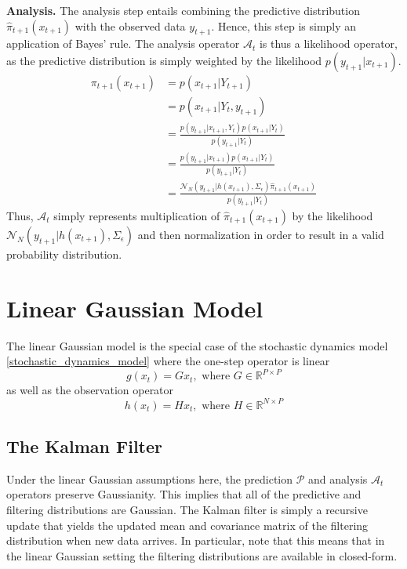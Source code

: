 \documentclass[12pt]{article}
\newcommand{\R}{\mathbb{R}}
\begin{document}
\bigskip
\noindent
\textbf{Analysis.} The analysis step entails combining the predictive distribution $\hat{\pi}_{t+1}(x_{t+1})$ with the observed data $y_{t+1}$. Hence, this step 
is simply an application of Bayes' rule. The analysis operator $\mathcal{A}_t$ is thus a likelihood operator, as the predictive distribution is simply weighted by 
the likelihood $p(y_{t+1}|x_{t+1})$. 
\begin{align*}
\pi_{t+1}(x_{t+1}) &= p(x_{t+1}|Y_{t+1}) \\
			   &= p(x_{t+1}|Y_t, y_{t+1}) \\
			   &= \frac{p(y_{t+1}|x_{t+1}, Y_t)p(x_{t+1}|Y_t)}{p(y_{t+1}|Y_t)} \\
			   &= \frac{p(y_{t+1}|x_{t+1})p(x_{t+1}|Y_t)}{p(y_{t+1}|Y_t)} \\
			   &= \frac{\mathcal{N}_N(y_{t+1}|h(x_{t+1}), \Sigma_{\epsilon}) \hat{\pi}_{t+1}(x_{t+1})}{p(y_{t+1}|Y_t)}
\end{align*}
Thus, $\mathcal{A}_t$ simply represents multiplication of $\hat{\pi}_{t+1}(x_{t+1})$ by the likelihood $\mathcal{N}_N(y_{t+1}|h(x_{t+1}), \Sigma_{\epsilon})$
and then normalization in order to result in a valid probability distribution. 

\section{Linear Gaussian Model}
The linear Gaussian model is the special case of the stochastic dynamics model \ref{stochastic_dynamics_model} where the one-step operator is linear 
\[g(x_t) = Gx_t, \text{ where } G \in \R^{P \times P}\]
as well as the observation operator 
\[h(x_t) = Hx_t, \text{ where } H \in \R^{N \times P}\]

\subsection{The Kalman Filter}
Under the linear Gaussian assumptions here, the prediction $\mathcal{P}$ and analysis $\mathcal{A}_t$ operators preserve Gaussianity. This implies that 
all of the predictive and filtering distributions are Gaussian. The Kalman filter is simply a recursive update that yields the updated mean and covariance matrix 
of the filtering distribution when new data arrives. In particular, note that this means that in the linear Gaussian setting the filtering distributions are available in 
closed-form. 
\end{document}

